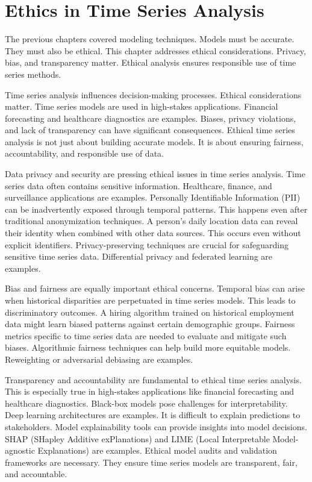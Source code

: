 \chapter{Ethics in Time Series Analysis}

The previous chapters covered modeling techniques. Models must be accurate. They must also be ethical. This chapter addresses ethical considerations. Privacy, bias, and transparency matter. Ethical analysis ensures responsible use of time series methods.

Time series analysis influences decision-making processes. Ethical considerations matter. Time series models are used in high-stakes applications. Financial forecasting and healthcare diagnostics are examples. Biases, privacy violations, and lack of transparency can have significant consequences. Ethical time series analysis is not just about building accurate models. It is about ensuring fairness, accountability, and responsible use of data.

Data privacy and security are pressing ethical issues in time series analysis. Time series data often contains sensitive information. Healthcare, finance, and surveillance applications are examples. Personally Identifiable Information (PII) can be inadvertently exposed through temporal patterns. This happens even after traditional anonymization techniques. A person's daily location data can reveal their identity when combined with other data sources. This occurs even without explicit identifiers. Privacy-preserving techniques are crucial for safeguarding sensitive time series data. Differential privacy and federated learning are examples.

Bias and fairness are equally important ethical concerns. Temporal bias can arise when historical disparities are perpetuated in time series models. This leads to discriminatory outcomes. A hiring algorithm trained on historical employment data might learn biased patterns against certain demographic groups. Fairness metrics specific to time series data are needed to evaluate and mitigate such biases. Algorithmic fairness techniques can help build more equitable models. Reweighting or adversarial debiasing are examples.

Transparency and accountability are fundamental to ethical time series analysis. This is especially true in high-stakes applications like financial forecasting and healthcare diagnostics. Black-box models pose challenges for interpretability. Deep learning architectures are examples. It is difficult to explain predictions to stakeholders. Model explainability tools can provide insights into model decisions. SHAP (SHapley Additive exPlanations) and LIME (Local Interpretable Model-agnostic Explanations) are examples. Ethical model audits and validation frameworks are necessary. They ensure time series models are transparent, fair, and accountable.

